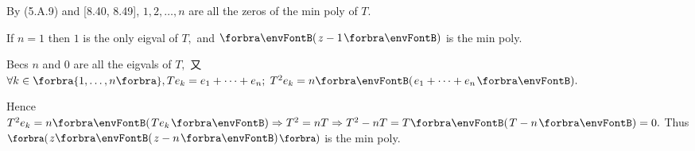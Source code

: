 By (5.A.9) and [8.40, 8.49], $1,2,\dots,n$ are all the zeros of the min poly of $T.$\PfEnd
\SepLine

\par\quad
If $n=1$ then $1$ is the only eigval of $T,$ and $\Par{z-1}$ is the min poly.\par\quad
Becs $n$ and $0$ are all the eigvals of $T,$ 又 $\forall k\in\Bra{1,\dots,n},T e_k=e_1+\dots+e_n;\;T^2 e_k=n \Par{e_1+\dots+e_n}.$\par\quad
Hence $T^2 e_k=n\Par{T e_k}\Rightarrow T^2=n T\Rightarrow T^2-n T=T\Par{T-n}=0.$ Thus $\BigPar{z\Par{z-n}}$ is the min poly.\PfEnd
\SepLine

